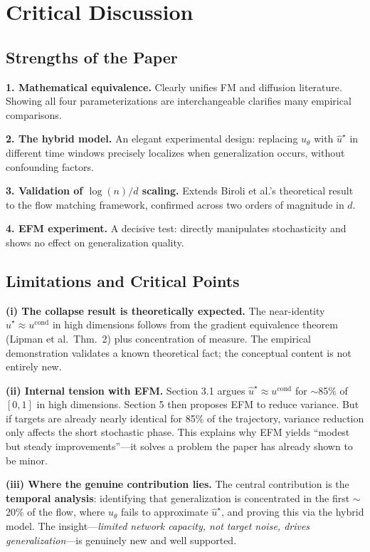 \documentclass[11pt, a4paper]{article}
\theoremstyle{plain}
\theoremstyle{definition}
\theoremstyle{remark}
\begin{document}
\section{Critical Discussion}
\label{sec:discussion}

\subsection{Strengths of the Paper}

\textbf{1. Mathematical equivalence.} Clearly unifies FM and diffusion literature. Showing all four parameterizations are interchangeable clarifies many empirical comparisons.

\textbf{2. The hybrid model.} An elegant experimental design: replacing $u_\theta$ with $\hat{u}^\star$ in different time windows precisely localizes when generalization occurs, without confounding factors.

\textbf{3. Validation of $\log(n)/d$ scaling.} Extends Biroli et al.'s theoretical result to the flow matching framework, confirmed across two orders of magnitude in $d$.

\textbf{4. EFM experiment.} A decisive test: directly manipulates stochasticity and shows no effect on generalization quality.

\subsection{Limitations and Critical Points}

\textbf{(i) The collapse result is theoretically expected.}
The near-identity $\hat{u}^\star \approx u^{\mathrm{cond}}$ in high dimensions follows from the gradient equivalence theorem (Lipman et al.\ Thm.\ 2) plus concentration of measure. The empirical demonstration validates a known theoretical fact; the conceptual content is not entirely new.

\textbf{(ii) Internal tension with EFM.}
Section 3.1 argues $\hat{u}^\star \approx u^{\mathrm{cond}}$ for $\sim$85\% of $[0,1]$ in high dimensions. Section 5 then proposes EFM to reduce variance. But if targets are already nearly identical for 85\% of the trajectory, variance reduction only affects the short stochastic phase. This explains why EFM yields ``modest but steady improvements''---it solves a problem the paper has already shown to be minor.

\textbf{(iii) Where the genuine contribution lies.}
The central contribution is the \textbf{temporal analysis}: identifying that generalization is concentrated in the first $\sim$20\% of the flow, where $u_\theta$ fails to approximate $\hat{u}^\star$, and proving this via the hybrid model. The insight---\emph{limited network capacity, not target noise, drives generalization}---is genuinely new and well supported.
\end{document}
